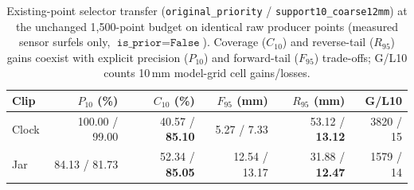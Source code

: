 \begin{table}[t]
\centering
\caption{Existing-point selector transfer (\texttt{original\_priority} / \texttt{support10\_coarse12mm}) at the unchanged 1,500-point budget on identical raw producer points (measured sensor surfels only, $\texttt{is\_prior}=\texttt{False}$). Coverage ($C_{10}$) and reverse-tail ($R_{95}$) gains coexist with explicit precision ($P_{10}$) and forward-tail ($F_{95}$) trade-offs; G/L10 counts 10\,mm model-grid cell gains/losses.}
\label{tab:budget-selection-transfer}
\footnotesize
\setlength{\tabcolsep}{6pt}
\begin{tabular}{lrrrrr}
\toprule
Clip & $P_{10}$ (\%) & $C_{10}$ (\%) & $F_{95}$ (mm) & $R_{95}$ (mm) & G/L10 \\
\midrule
Clock & 100.00 / 99.00 & 40.57 / \textbf{85.10} & 5.27 / 7.33 & 53.12 / \textbf{13.12} & 3820 / 15 \\
Jar & 84.13 / 81.73 & 52.34 / \textbf{85.05} & 12.54 / 13.17 & 31.88 / \textbf{12.47} & 1579 / 14 \\
\bottomrule
\end{tabular}
\end{table}
